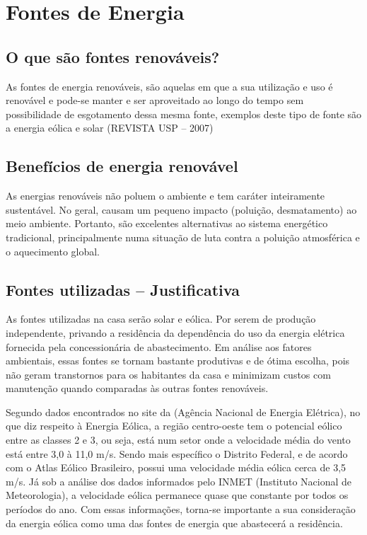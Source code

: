 \section{Fontes de Energia}

\subsection{O que são fontes renováveis?}

	As fontes de energia renováveis, são aquelas em que a sua utilização e uso é renovável e pode-se manter e ser aproveitado ao longo do tempo sem possibilidade de esgotamento dessa mesma fonte, exemplos deste tipo de fonte são a energia eólica e solar (REVISTA USP – 2007)

\subsection{Benefícios de energia renovável}

	As energias renováveis não poluem o ambiente e tem caráter inteiramente sustentável. No geral, causam um pequeno impacto (poluição, desmatamento) ao meio ambiente. Portanto, são excelentes alternativas ao sistema energético tradicional, principalmente numa situação de luta contra a poluição atmosférica e o aquecimento global.

\subsection{Fontes utilizadas -- Justificativa}

	As fontes utilizadas na casa serão solar e eólica. Por serem de produção independente, privando a residência da dependência do uso da energia elétrica fornecida pela concessionária de abastecimento. Em análise aos fatores ambientais, essas fontes se tornam bastante produtivas e de ótima escolha, pois não geram transtornos para os habitantes da casa e minimizam custos com manutenção quando comparadas às outras fontes renováveis.

	Segundo dados encontrados no site da \cite{2013Aneel} (Agência Nacional de Energia Elétrica), no que diz respeito à Energia Eólica, a região centro-oeste tem o potencial eólico entre as classes 2 e 3, ou seja, está num setor onde a velocidade média do vento está entre 3,0 à 11,0 m/s. Sendo mais específico o Distrito Federal, e de acordo com o Atlas Eólico Brasileiro, possui uma velocidade média eólica cerca de 3,5 m/s. Já sob a análise dos dados informados pelo INMET (Instituto Nacional de Meteorologia), a velocidade eólica permanece quase que constante por todos os períodos do ano. Com essas informações, torna-se importante a sua consideração da energia eólica como uma das fontes de energia que abastecerá a residência.

